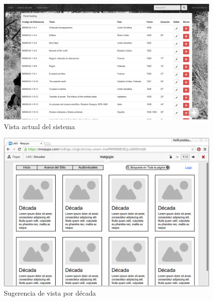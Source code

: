 \documentclass{beamer}
\begin{document}
\begin{frame}
	\begin{figure}[H]
		\centering
		\includegraphics[keepaspectratio=true,width=\linewidth]{Prototipo_07.png}
		\caption{Vista actual del sistema}
		\label{fig:protipo_angular}
	\end{figure}	
\end{frame}

\begin{frame}
	\begin{figure}[H]
		\centering
		\includegraphics[keepaspectratio=true,width=\linewidth]{Prototipo_08.png}
		\caption{Sugerencia de vista por década}
		\label{fig:protipo_angular}
	\end{figure}	
\end{frame}
\end{document}
